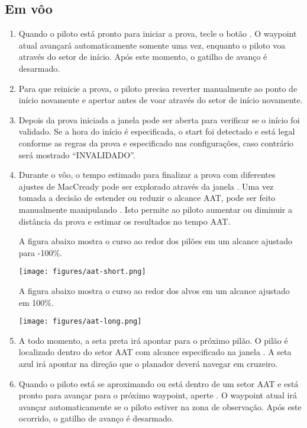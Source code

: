 \subsection*{Em vôo}
\begin{enumerate}
\item Quando o piloto está pronto para iniciar a prova, tecle o botão  . O waypoint atual avançará automaticamente somente uma vez, enquanto o piloto voa através do setor de início.  Após este momento, o gatilho de avanço é desarmado.
\item  Para que reinicie a prova, o piloto precisa reverter manualmente ao ponto de início novamente e apertar 
 antes de voar através do setor de início novamente.
\item  Depois da prova iniciada a janela   pode ser aberta para verificar se o início foi validado.  Se a hora do início é especificada, o start foi detectado e está legal conforme as regras da prova e especificado nas configurações, caso contrário será mostrado “INVALIDADO”.
\item  Durante o vôo, o tempo estimado para finalizar a prova com diferentes ajustes de MacCready pode ser explorado através da janela .
  Uma vez tomada a decisão de estender ou reduzir o alcance AAT, pode ser feito manualmente manipulando . Isto permite ao piloto aumentar ou diminuir a distância da prova e estimar os resultados no tempo AAT. 

A figura abaixo mostra o curso ao redor dos pilões em um alcance ajustado para -100\%.
\begin{center}
\texttt{[image: figures/aat-short.png]}
\end{center}

A figura abaixo mostra o curso ao redor dos alvos em um alcance ajustado em 100\%.
\begin{center}
\texttt{[image: figures/aat-long.png]}
\end{center}

\item  A todo momento, a seta preta irá apontar para o próximo pilão.  O pilão é localizado dentro do setor AAT com alcance especificado na janela  .  A seta azul irá apontar na direção que o planador deverá navegar em cruzeiro.

\item  Quando o piloto está se aproximando ou está dentro de um setor AAT e está pronto para avançar para o próximo waypoint, aperte  .  O waypoint atual irá avançar automaticamente se o piloto estiver na zona de observação.  Após este ocorrido, o gatilho de avanço é desarmado.


\end{enumerate}
